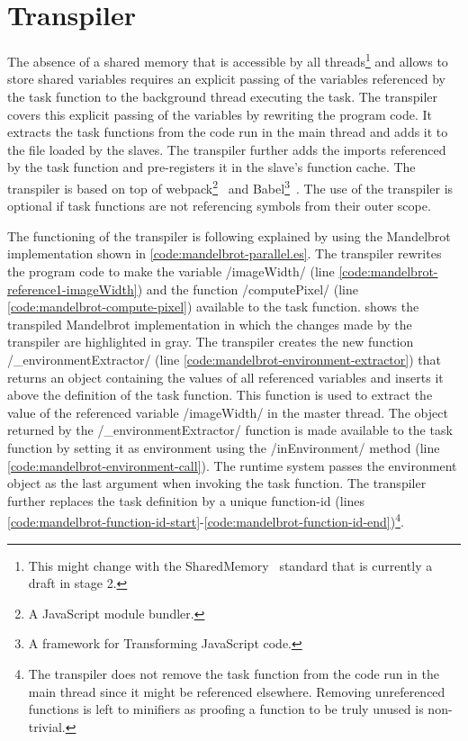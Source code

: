 \section{Transpiler}\label{sec:transpiler}
The absence of a shared memory that is accessible by all threads\footnote{This might change with the SharedMemory~\cite{Ecma2016} standard that is currently a draft in stage 2.} and allows to store shared variables requires an explicit passing of the variables referenced by the task function to the background thread executing the task. The transpiler covers this explicit passing of the variables by rewriting the program code. It extracts the task functions from the code run in the main thread and adds it to the file loaded by the slaves. The transpiler further adds the imports referenced by the task function and pre-registers it in the slave's function cache. The transpiler is based on top of webpack\footnote{A JavaScript module bundler.}~\cite{webpack} and Babel\footnote{A framework for Transforming JavaScript code.}~\cite{babel}. The use of the transpiler is optional if task functions are not referencing symbols from their outer scope. 


The functioning of the transpiler is following explained by using the Mandelbrot implementation shown in \cref{code:mandelbrot-parallel.es}. The transpiler rewrites the program code to make the variable \javascriptinline/imageWidth/ (line \ref{code:mandelbrot-reference1-imageWidth}) and the function \javascriptinline/computePixel/ (line \ref{code:mandelbrot-compute-pixel}) available to the task function.  shows the transpiled Mandelbrot implementation in which the changes made by the transpiler are highlighted in gray. The transpiler creates the new function \javascriptinline/_environmentExtractor/ (line \ref{code:mandelbrot-environment-extractor}) that returns an object containing the values of all referenced variables and inserts it above the definition of the task function. This function is used to extract the value of the referenced variable \javascriptinline/imageWidth/ in the master thread. The object returned by the \javascriptinline/_environmentExtractor/ function is made available to the task function by setting it as environment using the \javascriptinline/inEnvironment/ method (line \ref{code:mandelbrot-environment-call}). The runtime system passes the environment object as the last argument when invoking the task function. The transpiler further replaces the task definition by a unique function-id (lines \ref{code:mandelbrot-function-id-start}-\ref{code:mandelbrot-function-id-end})\footnote{The transpiler does not remove the task function from the code run in the main thread since it might be referenced elsewhere. Removing unreferenced functions is left to minifiers as proofing a function to be truly unused is non-trivial.}. 

